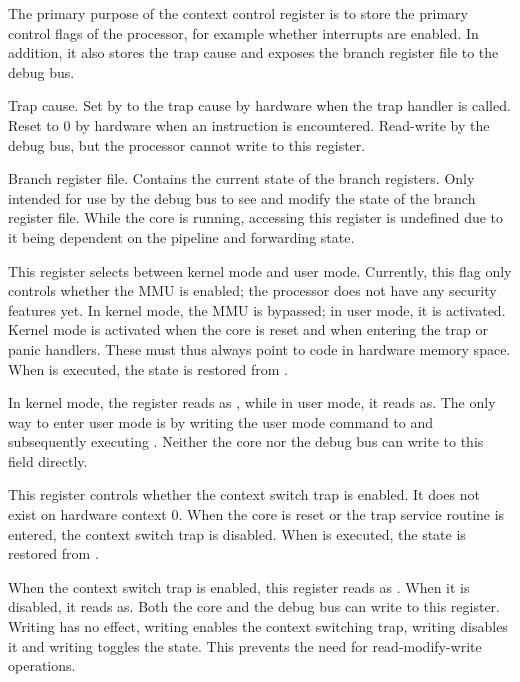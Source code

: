 The primary purpose of the context control register is to store the primary
control flags of the processor, for example whether interrupts are enabled. In
addition, it also stores the trap cause and exposes the branch register file to
the debug bus.

\debugCanWrite{}
Trap cause. Set by to the trap cause by hardware when the trap handler is 
called. Reset to 0 by hardware when an  instruction is encountered. 
Read-write by the debug bus, but the processor cannot write to this register.

\debugCanWrite{}
Branch register file. Contains the current state of the branch registers. Only
intended for use by the debug bus to see and modify the state of the branch
register file. While the core is running, accessing this register is undefined
due to it being dependent on the pipeline and forwarding state.

This register selects between kernel mode and user mode. Currently, this flag 
only controls whether the MMU is enabled; the \rvex{} processor does not have 
any security features yet. In kernel mode, the MMU is bypassed; in user mode, it 
is activated. Kernel mode is activated when the core is reset and when entering 
the trap or panic handlers. These must thus always point to code in hardware 
memory space. When  is executed, the state is restored from
.

In kernel mode, the register reads as , while in user mode, it reads 
as. The only way to enter user mode is by writing the user mode command 
to  and subsequently executing . Neither the core nor the 
debug bus can write to this field directly.

\debugCanWrite{}
\coreCanWrite{}
This register controls whether the context switch trap is enabled. It does not 
exist on hardware context 0. When the core is reset or the trap service routine 
is entered, the context switch trap is disabled. When  is executed, 
the state is restored from .

When the context switch trap is enabled, this register reads as . When 
it is disabled, it reads as. Both the core and the debug bus can write 
to this register. Writing  has no effect, writing  enables the 
context switching trap, writing  disables it and writing  
toggles the state. This prevents the need for read-modify-write operations.

